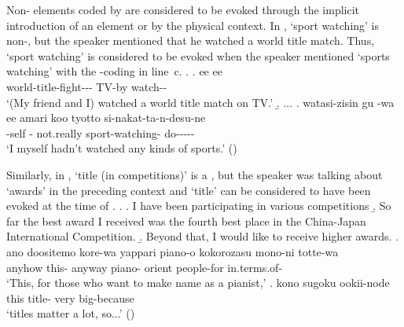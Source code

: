 
\noindent
Non- elements coded by  are considered to be evoked
through the implicit introduction of an element or by the physical context.
In \Next,
 `sport watching' is non-, but the speaker mentioned that he watched a world title match.
Thus, `sport watching' is considered to be evoked
when the speaker mentioned `sports watching' with the -coding in line~c.
%
\ex. \ag. ee  ee   \\
		 world-title-fight---  TV-by watch-- \\
		`(My friend and I) watched a world title match on TV.'
	\b. ...
	\bg. watasi-zisin gu -wa ee amari koo  tyotto si-nakat-ta-n-desu-ne \\
		-self  -  not.really  sport-watching-  do----- \\
		`I myself hadn't watched any kinds of sports.' \hfill{()}
%	

Similarly, in \Next,
 `title (in  competitions)' is a ,
but the speaker was talking about `awards' in the preceding context
and `title' can be considered to have been evoked at the time of  \Next[e].
%
\ex. \a. I have been participating in various  competitions
	\b. So far the best award I received was the fourth best place in the China-Japan International Competition.
	\b. Beyond that, I would like to receive higher awards.
	\bg. ano doositemo kore-wa yappari piano-o kokorozasu mono-ni totte-wa \\
		 anyhow this- anyway piano- orient people-for in.terms.of- \\
		`This, for those who want to make name as a pianist,'
	\bg. kono  sugoku ookii-node \\
		this title- very big-because \\
		`titles matter a lot, so...'
\hfill{()}
%

